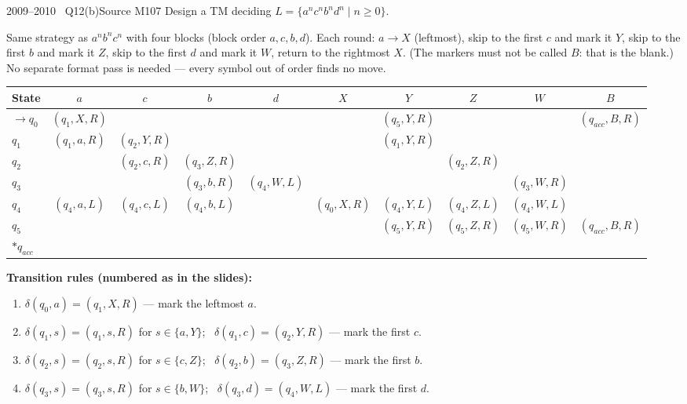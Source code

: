 \documentclass[11pt,a4paper]{article}
\begin{document}
\begin{question}{2009--2010 \textbullet\ Q12(b)}{Source M10}{7}
Design a TM deciding $L=\{a^nc^nb^nd^n\mid n\ge0\}$.
\end{question}
\begin{solution}
Same strategy as $a^nb^nc^n$ with four blocks (block order $a,c,b,d$). Each round: $a\to X$ (leftmost), skip to the first $c$ and mark it $Y$, skip to the first $b$ and mark it $Z$, skip to the first $d$ and mark it $W$, return to the rightmost $X$. (The markers must not be called $B$: that is the blank.) No separate format pass is needed --- every symbol out of order finds no move.
\begin{center}\footnotesize\setlength{\tabcolsep}{3pt}\begin{tabular}{l|ccccccccc}\toprule State & $a$ & $c$ & $b$ & $d$ & $X$ & $Y$ & $Z$ & $W$ & $B$\\\midrule
$\to q_0$ & $(q_1,X,R)$ & & & & & $(q_5,Y,R)$ & & & $(q_{acc},B,R)$\\
$q_1$ & $(q_1,a,R)$ & $(q_2,Y,R)$ & & & & $(q_1,Y,R)$ & & & \\
$q_2$ & & $(q_2,c,R)$ & $(q_3,Z,R)$ & & & & $(q_2,Z,R)$ & & \\
$q_3$ & & & $(q_3,b,R)$ & $(q_4,W,L)$ & & & & $(q_3,W,R)$ & \\
$q_4$ & $(q_4,a,L)$ & $(q_4,c,L)$ & $(q_4,b,L)$ & & $(q_0,X,R)$ & $(q_4,Y,L)$ & $(q_4,Z,L)$ & $(q_4,W,L)$ & \\
$q_5$ & & & & & & $(q_5,Y,R)$ & $(q_5,Z,R)$ & $(q_5,W,R)$ & $(q_{acc},B,R)$\\
$*q_{acc}$ & & & & & & & & & \\\bottomrule\end{tabular}\end{center}
\par\noindent\textbf{Transition rules (numbered as in the slides):}
{\small\begin{enumerate}[label=\arabic*.,itemsep=0pt]
\item $\delta(q_0,a)=(q_1,X,R)$ --- mark the leftmost $a$.
\item $\delta(q_1,s)=(q_1,s,R)$ for $s\in\{a,Y\}$; \ $\delta(q_1,c)=(q_2,Y,R)$ --- mark the first $c$.
\item $\delta(q_2,s)=(q_2,s,R)$ for $s\in\{c,Z\}$; \ $\delta(q_2,b)=(q_3,Z,R)$ --- mark the first $b$.
\item $\delta(q_3,s)=(q_3,s,R)$ for $s\in\{b,W\}$; \ $\delta(q_3,d)=(q_4,W,L)$ --- mark the first $d$.

\end{enumerate}}
\end{solution}
\end{document}
